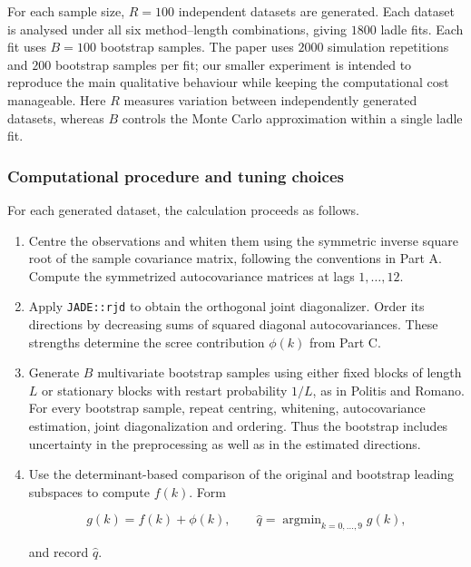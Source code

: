 \documentclass[
  11pt,
  a4paper,
]{article}
\begin{document}
For each sample size, \(R=100\) independent datasets are generated. Each
dataset is analysed under all six method--length combinations, giving
\(1800\) ladle fits. Each fit uses \(B=100\) bootstrap samples. The
paper uses \(2000\) simulation repetitions and \(200\) bootstrap samples
per fit; our smaller experiment is intended to reproduce the main
qualitative behaviour while keeping the computational cost manageable.
Here \(R\) measures variation between independently generated datasets,
whereas \(B\) controls the Monte Carlo approximation within a single
ladle fit.

\hypertarget{computational-procedure-and-tuning-choices}{%
\subsubsection{Computational procedure and tuning
choices}\label{computational-procedure-and-tuning-choices}}

For each generated dataset, the calculation proceeds as follows.

\begin{enumerate}
\def\labelenumi{\arabic{enumi}.}
\item
  Centre the observations and whiten them using the symmetric inverse
  square root of the sample covariance matrix, following the conventions
  in Part A. Compute the symmetrized autocovariance matrices at lags
  \(1,\ldots,12\).
\item
  Apply \texttt{JADE::rjd} to obtain the orthogonal joint diagonalizer.
  Order its directions by decreasing sums of squared diagonal
  autocovariances. These strengths determine the scree contribution
  \(\phi(k)\) from Part C.
\item
  Generate \(B\) multivariate bootstrap samples using either fixed
  blocks of length \(L\) or stationary blocks with restart probability
  \(1/L\), as in Politis and Romano. For every bootstrap sample, repeat
  centring, whitening, autocovariance estimation, joint diagonalization
  and ordering. Thus the bootstrap includes uncertainty in the
  preprocessing as well as in the estimated directions.
\item
  Use the determinant-based comparison of the original and bootstrap
  leading subspaces to compute \(f(k)\). Form

  \[
  g(k)=f(k)+\phi(k),\qquad
  \widehat q=\mathop{\arg\min}_{k=0,\ldots,9}g(k),
  \]

  and record \(\widehat q\).
\end{enumerate}
\end{document}
